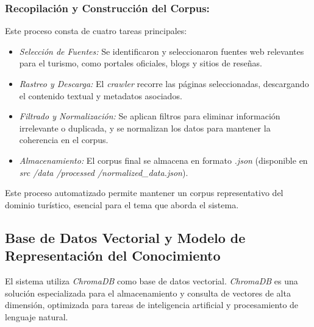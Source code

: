 \documentclass[10pt]{llncs}
\begin{document}
\subsubsection{Recopilación y Construcción del Corpus:} Este proceso consta de cuatro tareas principales:

\begin{itemize}
    \item \textit{Selección de Fuentes:} Se identificaron y seleccionaron fuentes web relevantes para el turismo, como portales oficiales, blogs y sitios de reseñas.
    \item \textit{Rastreo y Descarga:} El \textit{crawler} recorre las páginas seleccionadas, descargando el contenido textual y metadatos asociados.
    \item \textit{Filtrado y Normalización:} Se aplican filtros para eliminar información irrelevante o duplicada, y se normalizan los datos para mantener la coherencia en el corpus.
    \item \textit{Almacenamiento:} El corpus final se almacena en formato \textit{.json} (disponible en \textit{src /data /processed /normalized\_data.json}).
\end{itemize}

Este proceso automatizado permite mantener un corpus representativo del dominio turístico, esencial para el tema que aborda el sistema.

\vspace{\baselineskip}
\subsection{Base de Datos Vectorial y Modelo de Representación del Conocimiento}

El sistema utiliza \textit{ChromaDB} como base de datos vectorial. \textit{ChromaDB} es una solución 
especializada para el almacenamiento y consulta de vectores de alta dimensión, optimizada para tareas de inteligencia artificial y procesamiento de lenguaje natural.
\end{document}
